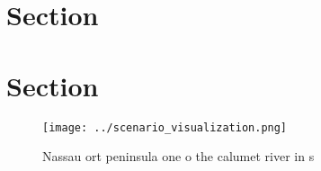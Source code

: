 \documentclass[a4paper]{article}
\begin{document}
\section{Section}

\section{Section}

\begin{figure}
\centering
\texttt{[image: ../scenario\_visualization.png]}
\caption{Nassau ort peninsula one o the calumet river in s
}
\end{figure}
 
\end{document}
